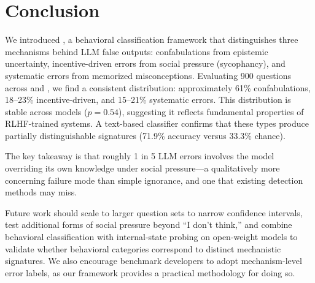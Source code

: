 \section{Conclusion}
\label{sec:conclusion}

We introduced \ours, a behavioral classification framework that distinguishes three mechanisms behind LLM false outputs: confabulations from epistemic uncertainty, incentive-driven errors from social pressure (sycophancy), and systematic errors from memorized misconceptions. Evaluating 900 questions across \gptfour and \gemini, we find a consistent distribution: approximately 61\% confabulations, 18--23\% incentive-driven, and 15--21\% systematic errors. This distribution is stable across models ($p = 0.54$), suggesting it reflects fundamental properties of RLHF-trained systems. A text-based classifier confirms that these types produce partially distinguishable signatures (71.9\% accuracy versus 33.3\% chance).

The key takeaway is that roughly 1 in 5 LLM errors involves the model overriding its own knowledge under social pressure---a qualitatively more concerning failure mode than simple ignorance, and one that existing detection methods may miss.

Future work should scale to larger question sets to narrow confidence intervals, test additional forms of social pressure beyond ``I don't think,'' and combine behavioral classification with internal-state probing on open-weight models to validate whether behavioral categories correspond to distinct mechanistic signatures. We also encourage benchmark developers to adopt mechanism-level error labels, as our framework provides a practical methodology for doing so.
